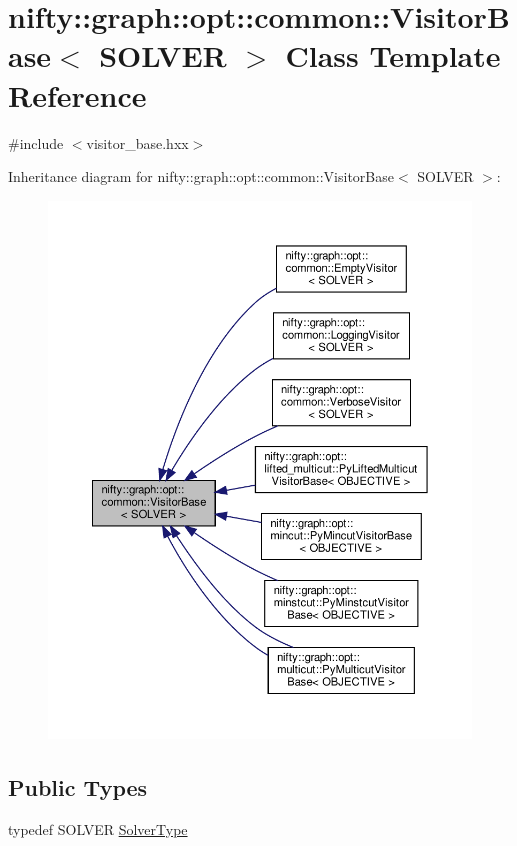 \hypertarget{classnifty_1_1graph_1_1opt_1_1common_1_1VisitorBase}{}\section{nifty\+:\+:graph\+:\+:opt\+:\+:common\+:\+:Visitor\+Base$<$ S\+O\+L\+V\+ER $>$ Class Template Reference}
\label{classnifty_1_1graph_1_1opt_1_1common_1_1VisitorBase}


{\ttfamily \#include $<$visitor\+\_\+base.\+hxx$>$}



Inheritance diagram for nifty\+:\+:graph\+:\+:opt\+:\+:common\+:\+:Visitor\+Base$<$ S\+O\+L\+V\+ER $>$\+:
\nopagebreak
\begin{figure}[H]
\begin{center}
\leavevmode
\includegraphics[width=350pt]{classnifty_1_1graph_1_1opt_1_1common_1_1VisitorBase__inherit__graph}
\end{center}
\end{figure}
\subsection*{Public Types}
\begin{DoxyCompactItemize}
\item 
typedef S\+O\+L\+V\+ER \hyperlink{classnifty_1_1graph_1_1opt_1_1common_1_1VisitorBase_a433d03139897d4aefe27315b2bbb3adc}{Solver\+Type}
\end{DoxyCompactItemize}
